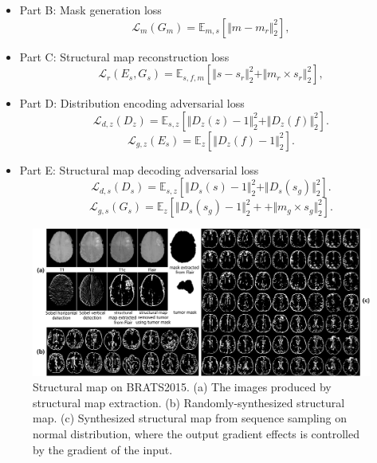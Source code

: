\documentclass[runningheads]{llncs}
\begin{document}
	\begin{itemize}
		\item{Part B: Mask generation loss}
		\begin{equation}
		\mathcal{L}_{m}(G_m)=\mathbb{E}_{m,s}[\Vert{m-m_r}\Vert_{2}^{2}],
		\end{equation}
		\item{Part C: Structural map reconstruction loss} 
		\begin{equation}
		\mathcal{L}_{r}(E_s,G_s)=\mathbb{E}_{s,f,m}[\Vert{s-s_r}\Vert_{2}^{2}+\Vert{m_r\times s_r}\Vert_{2}^{2}],
		\end{equation}
		\item{Part D: Distribution encoding adversarial loss} 
		\begin{equation}
		\mathcal{L}_{d,z}(D_{z})=\mathbb{E}_{s,z}[\Vert{D_{z}(z)-1}\Vert_{2}^{2}+\Vert{D_{z}(f)}\Vert_{2}^{2}].
		\end{equation}
		\begin{equation}
		\mathcal{L}_{g,z}(E_s)=\mathbb{E}_{z}[\Vert{D_{z}(f)-1}\Vert_{2}^{2}].	
		\end{equation}
		\item{Part E: Structural map decoding adversarial loss} 
		\begin{equation}
		\mathcal{L}_{d,s}(D_{s})=\mathbb{E}_{s,z}[\Vert{D_{s}(s)-1}\Vert_{2}^{2}+\Vert{D_{s}(s_g)}\Vert_{2}^{2}].
		\end{equation}
		\begin{equation}
		\mathcal{L}_{g,s}(G_s)=\mathbb{E}_{z}[\Vert{D_{s}(s_g)-1}\Vert_{2}^{2}++\Vert{m_g\times s_g}\Vert_{2}^{2}].	
		\end{equation}
	\end{itemize}
	\begin{figure}[th]
		\centering
		\includegraphics[width=1\linewidth]{figures/brats_f}
		\caption{Structural map on BRATS2015. (a) The images produced by structural map extraction. (b) Randomly-synthesized structural map. (c) Synthesized structural map from sequence sampling on normal distribution, where the output gradient effects is controlled by the gradient of the input. }
		\label{generated_f}
	\end{figure}
\end{document}
